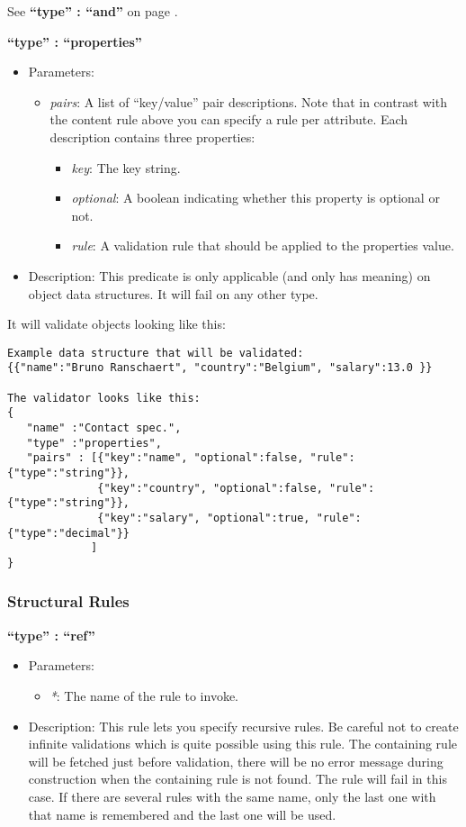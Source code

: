 \documentclass[a4paper]{article}
\newcommand{\ruledef}[3]{
\medskip
\textbf{#1}

\begin{itemize}
\setlength{\itemsep}{1pt}
\setlength{\parskip}{0pt}
\setlength{\parsep}{0pt}
   \item Parameters: #2
   \item Description: #3
\end{itemize}
}
\newcommand{\rulename}[1]{\textbf{``type'' : ``#1''}}
\newcommand{\param}[1]{\textsl{#1}:}
\begin{document}
See \rulename{and} on page \pageref{and}. 

\ruledef{\rulename{properties}}{\begin{itemize} \item \param{pairs} A list of ``key/value'' pair descriptions. Note that in contrast with the content rule above you can specify a rule per attribute. Each description contains three properties: \begin{itemize} \item \param{key} The key string. \item \param{optional} A boolean indicating whether this property is optional or not. \item \param{rule} A validation rule that should be applied to the properties value. \end{itemize}  \end{itemize}}{This predicate is only applicable (and only has meaning) on object data structures. It will fail on any other type.}

It will validate objects looking like this:
 
\begin{lstlisting}
Example data structure that will be validated:
{{"name":"Bruno Ranschaert", "country":"Belgium", "salary":13.0 }}

The validator looks like this:
{
   "name" :"Contact spec.",
   "type" :"properties",
   "pairs" : [{"key":"name", "optional":false, "rule":{"type":"string"}},
              {"key":"country", "optional":false, "rule":{"type":"string"}},
              {"key":"salary", "optional":true, "rule":{"type":"decimal"}}
             ]
}
\end{lstlisting}

\subsubsection{Structural Rules }

\ruledef{\rulename{ref}}{\begin{itemize} \item \param{*} The name of the rule to invoke. \end{itemize}}{ This rule lets you specify recursive rules. Be careful not to create infinite validations which is quite possible using this rule. The containing rule will be fetched just before validation, there will be no error message during construction when the containing rule is not found. The rule will fail in this case. If there are several rules with the same name, only the last one with that name is remembered and the last one will be used.}
\end{document}
